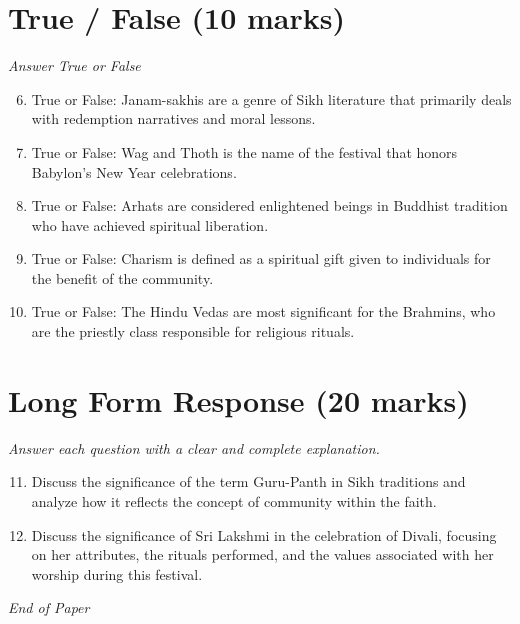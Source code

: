 \documentclass[12pt]{article}
\begin{document}
\section*{True / False (10 marks)}
\textit{Answer True or False}
\begin{enumerate}[label=\arabic*.]
\setcounter{enumi}{5}
\item True or False: Janam-sakhis are a genre of Sikh literature that primarily deals with redemption narratives and moral lessons.
\item True or False: Wag and Thoth is the name of the festival that honors Babylon's New Year celebrations.
\item True or False: Arhats are considered enlightened beings in Buddhist tradition who have achieved spiritual liberation.
\item True or False: Charism is defined as a spiritual gift given to individuals for the benefit of the community.
\item True or False: The Hindu Vedas are most significant for the Brahmins, who are the priestly class responsible for religious rituals.
\end{enumerate}

\section*{Long Form Response (20 marks)}
\textit{Answer each question with a clear and complete explanation.}
\begin{enumerate}[label=\arabic*.]
\setcounter{enumi}{10}
\item Discuss the significance of the term Guru-Panth in Sikh traditions and analyze how it reflects the concept of community within the faith.
\item Discuss the significance of Sri Lakshmi in the celebration of Divali, focusing on her attributes, the rituals performed, and the values associated with her worship during this festival.
\end{enumerate}

\vfill
\noindent\textit{End of Paper}
\end{document}
